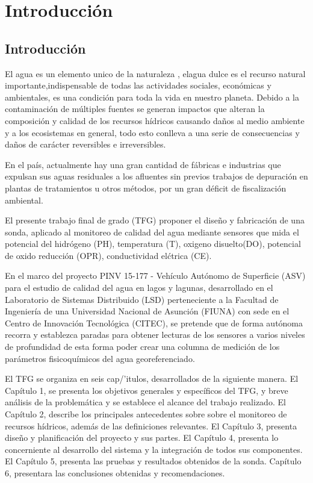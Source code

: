 \chapter[Capítulo 1. Introducción]{Introducción}
\pagestyle{fancy}

\section{Introducción}
El agua es un elemento unico de la naturaleza \cite{caribbean_seguridad_2020}, elagua dulce es el recurso natural importante,indispensable de todas las actividades sociales, económicas y ambientales, es una condición para toda la vida en nuestro planeta.
Debido a la contaminación de múltiples fuentes se generan impactos que alteran la composición y calidad de los recursos hídricos causando daños al medio ambiente y a los ecosistemas en general, todo esto conlleva a una serie de consecuencias y daños de carácter reversibles e irreversibles.

En el pa\'is, actualmente hay una gran cantidad de f\'abricas e industrias que expulsan sus aguas residuales a los afluentes sin previos trabajos de depuraci\'on en plantas de tratamientos u otros m\'etodos, por un gran d\'eficit de fiscalizaci\'on ambiental.

%
%
%
%

El presente trabajo final de grado (TFG) proponer el dise\~no y fabricación de una sonda, aplicado al monitoreo de calidad del agua mediante sensores que mida el potencial del hidr\'ogeno (PH), temperatura (T), oxigeno disuelto(DO), potencial de oxido reducci\'on (OPR), conductividad el\'ctrica (CE).
 
En el marco del proyecto  PINV 15-177 - Veh\'iculo Aut\'onomo de Superficie (ASV) para el estudio de calidad del agua en lagos y lagunas, desarrollado en el Laboratorio de Sistemas Distribuido (LSD) perteneciente a la Facultad de Ingenier\'ia de una Universidad Nacional de Asunci\'on (FIUNA) con sede en el Centro de Innovaci\'on Tecnol\'ogica (CITEC), se pretende que de forma aut\'onoma recorra y establezca paradas para obtener lecturas de los sensores a varios niveles de profundidad de esta forma poder crear una columna de medición de los parámetros fisicoquímicos del agua georeferenciado.

El TFG  se organiza en seis cap/'itulos, desarrollados de la siguiente manera. 
El Capítulo 1, se presenta los objetivos generales y espec\'ificos del TFG,  y breve an\'alisis de la problem\'atica y se establece el alcance del trabajo realizado.
El Capítulo 2, describe los principales antecedentes sobre sobre el monitoreo de recursos h\'idricos, adem\'as de las definiciones relevantes. 
El Capítulo 3, presenta dise\~no y planificaci\'on del proyecto y sus partes.
El Capítulo 4, presenta lo concerniente al desarrollo del sistema y la integraci\'on de todos sus componentes.   
El Capítulo 5, presenta las pruebas y resultados obtenidos de la sonda. 
Capítulo 6,  presentara las conclusiones obtenidas y recomendaciones.

